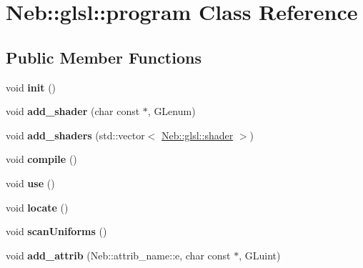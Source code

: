 \hypertarget{classNeb_1_1glsl_1_1program}{\section{\-Neb\-:\-:glsl\-:\-:program \-Class \-Reference}
\label{classNeb_1_1glsl_1_1program}
}
\subsection*{\-Public \-Member \-Functions}
\begin{DoxyCompactItemize}
\item 
\hypertarget{classNeb_1_1glsl_1_1program_a08f76e03821552f84bd29136bf6bfee0}{void {\bfseries init} ()}\label{classNeb_1_1glsl_1_1program_a08f76e03821552f84bd29136bf6bfee0}

\item 
\hypertarget{classNeb_1_1glsl_1_1program_adf4e183d4d8fe9eeb51fc9228e7e7466}{void {\bfseries add\-\_\-shader} (char const $\ast$, \-G\-Lenum)}\label{classNeb_1_1glsl_1_1program_adf4e183d4d8fe9eeb51fc9228e7e7466}

\item 
\hypertarget{classNeb_1_1glsl_1_1program_acd96fbde1e8d4166dac27a206dfedb92}{void {\bfseries add\-\_\-shaders} (std\-::vector$<$ \hyperlink{classNeb_1_1glsl_1_1shader}{\-Neb\-::glsl\-::shader} $>$)}\label{classNeb_1_1glsl_1_1program_acd96fbde1e8d4166dac27a206dfedb92}

\item 
\hypertarget{classNeb_1_1glsl_1_1program_a715bfbf117521d603ad319186e3de2bb}{void {\bfseries compile} ()}\label{classNeb_1_1glsl_1_1program_a715bfbf117521d603ad319186e3de2bb}

\item 
\hypertarget{classNeb_1_1glsl_1_1program_a6bd27788c6eb2e0be2f852cde11940f9}{void {\bfseries use} ()}\label{classNeb_1_1glsl_1_1program_a6bd27788c6eb2e0be2f852cde11940f9}

\item 
\hypertarget{classNeb_1_1glsl_1_1program_a9e3346e5f38bf0912776ffcfe6ae5806}{void {\bfseries locate} ()}\label{classNeb_1_1glsl_1_1program_a9e3346e5f38bf0912776ffcfe6ae5806}

\item 
\hypertarget{classNeb_1_1glsl_1_1program_aa74a1d15b98280964cb658b7bc5eeaff}{void {\bfseries scan\-Uniforms} ()}\label{classNeb_1_1glsl_1_1program_aa74a1d15b98280964cb658b7bc5eeaff}

\item 
\hypertarget{classNeb_1_1glsl_1_1program_a1f0afccbe7c4c3a49f9e7160d8df47b3}{void {\bfseries add\-\_\-attrib} (\-Neb\-::attrib\-\_\-name\-::e, char const $\ast$, \-G\-Luint)}\label{classNeb_1_1glsl_1_1program_a1f0afccbe7c4c3a49f9e7160d8df47b3}


\end{DoxyCompactItemize}
